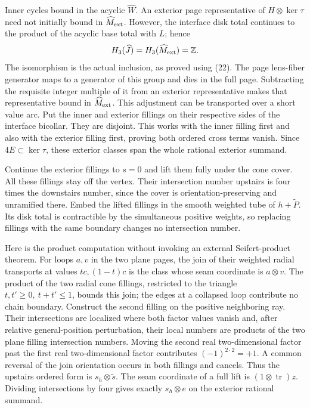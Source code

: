 \documentclass[11pt]{article}
\newcommand{\Z}{\mathbb Z}
\newcommand{\Tr}{\operatorname{tr}}
\begin{document}
Inner cycles bound in the acyclic \(\widehat W\).
An exterior page representative of \(H\otimes\ker\tau\)
need not initially bound in \(\widehat M_{\rm ext}\).
However, the interface disk total continues to the product
of the acyclic base total with \(L\); hence
\[
 H_3(\widehat J)=H_3(\widehat M_{\rm ext})=\Z .
\]
The isomorphism is the actual inclusion, as proved using (22).
The page lens-fiber generator maps to a generator of this
group and dies in the full page. Subtracting the requisite
integer multiple of it from an exterior representative
makes that representative bound in \(\widehat M_{\rm ext}\).
This adjustment can be transported over a short value arc.
Put the inner and exterior fillings on their respective sides
of the interface bicollar. They are disjoint. This works
with the inner filling first and also with the exterior
filling first, proving both ordered cross terms vanish.
Since \(4E\subset\ker\tau\), these exterior classes span
the whole rational exterior summand.

Continue the exterior fillings to \(s=0\) and lift them
fully under the cone cover. All these fillings stay off
the vertex. Their intersection number upstairs is four
times the downstairs number, since the cover is
orientation-preserving and unramified there.
Embed the lifted fillings in the smooth weighted tube
of \(h+\widetilde P\). Its disk total is contractible
by the simultaneous positive weights, so replacing
fillings with the same boundary changes no intersection
number.

Here is the product computation without invoking an external
Seifert-product theorem. For loops \(a,v\) in the two plane
pages, the join of their weighted radial transports at
values \(tc,(1-t)c\) is the class whose seam coordinate
is \(a\otimes v\). The product of the two radial cone
fillings, restricted to the triangle \(t,t'\ge0,\ t+t'\le1\),
bounds this join; the edges at a collapsed loop contribute
no chain boundary. Construct the second filling on the
positive neighboring ray. Their intersections are localized
where both factor values vanish and, after relative
general-position perturbation, their local numbers are
products of the two plane filling intersection numbers.
Moving the second real two-dimensional factor past the
first real two-dimensional factor contributes
\((-1)^{2\cdot2}=+1\). A common reversal of the join
orientation occurs in both fillings and cancels.
Thus the upstairs ordered form is
\(s_h\otimes\widetilde s\).
The seam coordinate of a full lift is
\((1\otimes\Tr)z\). Dividing intersections by four gives
exactly \(s_h\otimes e\) on the exterior rational summand.
\end{document}

